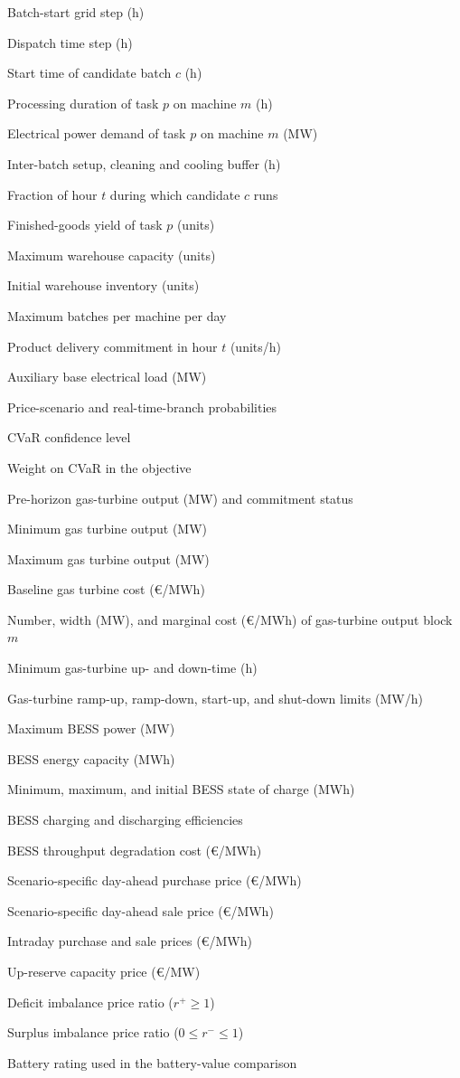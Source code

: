 \documentclass[5p,times,twocolumn]{elsarticle}
\newenvironment{nomlist}{%
  \begingroup\footnotesize
  \list{}{%
    \setlength{\labelwidth}{0.27\columnwidth}%
    \setlength{\labelsep}{4pt}%
    \setlength{\leftmargin}{\dimexpr\labelwidth+\labelsep\relax}%
    \setlength{\itemsep}{0.5pt}\setlength{\parsep}{0pt}%
    \setlength{\topsep}{1pt}\setlength{\partopsep}{0pt}%
    \renewcommand{\makelabel}[1]{##1\hfil}}%
}{\endlist\endgroup}
\newcommand{\nomheading}[1]{%
  \Needspace{4\baselineskip}%
  \par\vspace{3pt}\noindent{\footnotesize\bfseries\itshape #1}\par\vspace{1pt}}
\newcommand{\nomitem}[2]{\item[#1] #2}
\begin{document}
\nomheading{Parameters}
\begin{nomlist}
\nomitem{$\Delta_s$}{Batch-start grid step (h)}
\nomitem{$\Delta t$}{Dispatch time step (h)}
\nomitem{$a_c$}{Start time of candidate batch $c$ (h)}
\nomitem{$td_{m,p}$}{Processing duration of task $p$ on machine $m$ (h)}
\nomitem{$d_{m,p}$}{Electrical power demand of task $p$ on machine $m$ (MW)}
\nomitem{$t_{\mathrm{buffer}}$}{Inter-batch setup, cleaning and cooling buffer (h)}
\nomitem{$\varphi_{c,t}$}{Fraction of hour $t$ during which candidate $c$ runs}
\nomitem{$Y_p$}{Finished-goods yield of task $p$ (units)}
\nomitem{$N_{\max}$}{Maximum warehouse capacity (units)}
\nomitem{$N_0,N_{\mathrm{init}}$}{Initial warehouse inventory (units)}
\nomitem{$N_{\max}^{\mathrm{batch}}$}{Maximum batches per machine per day}
\nomitem{$n_{\mathrm{prod,dem},t}$}{Product delivery commitment in hour $t$ (units/h)}
\nomitem{$l_{\mathrm{base},t}$}{Auxiliary base electrical load (MW)}
\nomitem{$\pi_s,\pi_w$}{Price-scenario and real-time-branch probabilities}
\nomitem{$\alpha$}{CVaR confidence level}
\nomitem{$\beta$}{Weight on CVaR in the objective}
\nomitem{$P_{\mathrm{GT},0},u_{\mathrm{GT},0}$}{Pre-horizon gas-turbine output (MW) and commitment status}
\nomitem{$P_{\mathrm{GT,min}}$}{Minimum gas turbine output (MW)}
\nomitem{$P_{\mathrm{GT,max}}$}{Maximum gas turbine output (MW)}
\nomitem{$C_0^{\mathrm{GT}}$}{Baseline gas turbine cost (\euro/MWh)}
\nomitem{$N_m,w_m,C_m^{\mathrm{GT}}$}{Number, width (MW), and marginal cost (\euro/MWh) of gas-turbine output block $m$}
\nomitem{$MUT,MDT$}{Minimum gas-turbine up- and down-time (h)}
\nomitem{$RU,RD,SU,SD$}{Gas-turbine ramp-up, ramp-down, start-up, and shut-down limits (MW/h)}
\nomitem{$P_{\max}^{\mathrm{BESS}}$}{Maximum BESS power (MW)}
\nomitem{$E_{\max}^{\mathrm{BESS}}$}{BESS energy capacity (MWh)}
\nomitem{$SoC_{\min},SoC_{\max},SoC_0$}{Minimum, maximum, and initial BESS state of charge (MWh)}
\nomitem{$\eta_{\mathrm{ch}},\eta_{\mathrm{dis}}$}{BESS charging and discharging efficiencies}
\nomitem{$C_{\mathrm{TP}}$}{BESS throughput degradation cost (\euro/MWh)}
\nomitem{$\lambda_{\mathrm{buy},t,s}^{\mathrm{DA}}$}{Scenario-specific day-ahead purchase price (\euro/MWh)}
\nomitem{$\lambda_{\mathrm{sell},t,s}^{\mathrm{DA}}$}{Scenario-specific day-ahead sale price (\euro/MWh)}
\nomitem{$\lambda_{\mathrm{buy},t,s}^{\mathrm{ID}},\lambda_{\mathrm{sell},t,s}^{\mathrm{ID}}$}{Intraday purchase and sale prices (\euro/MWh)}
\nomitem{$\lambda_{t,s}^{\mathrm{res}}$}{Up-reserve capacity price (\euro/MW)}
\nomitem{$r_{t,s,w}^{+}$}{Deficit imbalance price ratio ($r^+\ge 1$)}
\nomitem{$r_{t,s,w}^{-}$}{Surplus imbalance price ratio ($0\le r^-\le 1$)}
\nomitem{$\kappa$}{Battery rating used in the battery-value comparison}
\end{nomlist}
\end{document}
